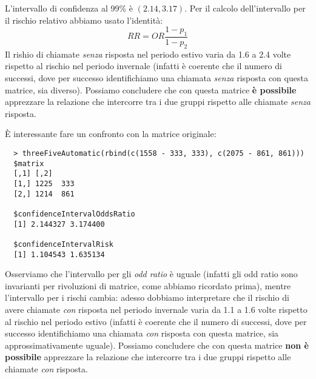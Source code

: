 L'intervallo di confidenza al 99\% \`e $(2.14, 3.17)$. Per il calcolo
dell'intervallo per il rischio relativo abbiamo usato l'identit\`a:
\begin{displaymath}
  RR = OR\frac{1-p_1}{1-p_2}
\end{displaymath}
Il rishio di chiamate \emph{senza} risposta nel periodo estivo varia
da 1.6 a 2.4 volte rispetto al rischio nel periodo invernale (infatti
\`e coerente che il numero di successi, dove per successo
identifichiamo una chiamata \emph{senza} risposta con questa matrice,
sia diverso). Possiamo concludere che con questa matrice \textbf{\`e
  possibile} apprezzare la relazione che intercorre tra i due gruppi
rispetto alle chiamate \emph{senza} risposta.

\`E interessante fare un confronto con la matrice originale:
\begin{lstlisting}
  > threeFiveAutomatic(rbind(c(1558 - 333, 333), c(2075 - 861, 861)))
  $matrix
  [,1] [,2]
  [1,] 1225  333
  [2,] 1214  861

  $confidenceIntervalOddsRatio
  [1] 2.144327 3.174400

  $confidenceIntervalRisk
  [1] 1.104543 1.635134 
\end{lstlisting}
Osserviamo che l'intervallo per gli \emph{odd ratio} \`e uguale
(infatti gli odd ratio sono invarianti per rivoluzioni di matrice,
come abbiamo ricordato prima), mentre l'intervallo per i rischi
cambia: adesso dobbiamo interpretare che il rischio di avere chiamate
\emph{con} risposta nel periodo invernale varia da 1.1 a 1.6 volte
rispetto al rischio nel periodo estivo (infatti \`e coerente che il
numero di successi, dove per successo identifichiamo una chiamata
\emph{con} risposta con questa matrice, sia approssimativamente
uguale). Possiamo concludere che con questa matrice \textbf{non \`e
  possibile} apprezzare la relazione che intercorre tra i due gruppi
rispetto alle chiamate \emph{con} risposta.

